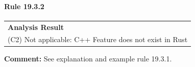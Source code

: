 \paragraph{Rule 19.3.2}
\begin{longtable}{p{13cm}}
\textbf{Analysis Result} \\
(C2) Not applicable: C++ Feature does not exist in Rust \\
\end{longtable}
\textbf{Comment:} See explanation and example rule 19.3.1. \\
